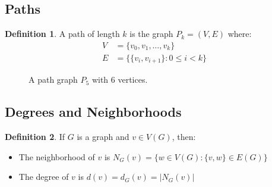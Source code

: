\documentclass{article}
\theoremstyle{definition}
\newtheorem{definition}{Definition}
\begin{document}
\subsection{Paths}
\begin{definition}
A path of length $k$ is the graph $P_k = (V, E)$ where:
\begin{align*}
V &= \{v_0, v_1, \ldots, v_k\}\\
E &= \{\{v_i, v_{i+1}\} : 0 \leq i < k\}
\end{align*}
\end{definition}

\begin{figure}[H]
\centering
{}
\caption{A path graph $P_5$ with 6 vertices.}
\end{figure}

\subsection{Degrees and Neighborhoods}

\begin{definition}
If $G$ is a graph and $v \in V(G)$, then:
\begin{itemize}
\item The neighborhood of $v$ is $N_G(v) = \{w \in V(G) : \{v,w\} \in E(G)\}$
\item The degree of $v$ is $d(v) = d_G(v) = |N_G(v)|$
\end{itemize}
\end{definition}
\end{document}
